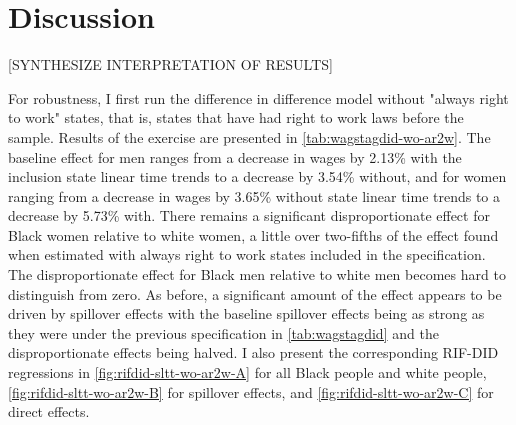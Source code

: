 \documentclass[11pt]{article}
\begin{document}

\section{Discussion}\label{sec:disc}
[SYNTHESIZE INTERPRETATION OF RESULTS]

For robustness, I first run the difference in difference model without "always right to work" states, that is, states that have had right to work laws before the sample. Results of the exercise are presented in \autoref{tab:wagstagdid-wo-ar2w}. The baseline effect for men ranges from a decrease in wages by 2.13\% with the inclusion state linear time trends to a decrease by 3.54\% without, and for women ranging from a decrease in wages by 3.65\% without state linear time trends to a decrease by 5.73\% with. There remains a significant disproportionate effect for Black women relative to white women, a little over two-fifths of the effect found when estimated with always right to work states included in the specification. The disproportionate effect for Black men relative to white men becomes hard to distinguish from zero. As before, a significant amount of the effect appears to be driven by spillover effects with the baseline spillover effects being as strong as they were under the previous specification in \autoref{tab:wagstagdid} and the disproportionate effects being halved. I also present the corresponding RIF-DID regressions in \autoref{fig:rifdid-sltt-wo-ar2w-A} for all Black people and white people, \autoref{fig:rifdid-sltt-wo-ar2w-B} for spillover effects, and \autoref{fig:rifdid-sltt-wo-ar2w-C} for direct effects. 
\end{document}
